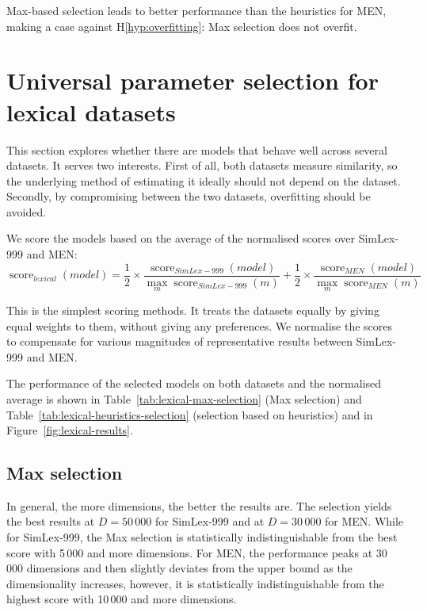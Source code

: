 Max-based selection leads to better performance than the heuristics for MEN, making a case against H\ref{hyp:overfitting}: Max selection does not overfit.

\section{Universal parameter selection for lexical datasets}
\label{sec:universal-lexical-param-selection}

This section explores whether there are models that behave well across several datasets. It serves two interests. First of all, both datasets measure similarity, so the underlying method of estimating it ideally should not depend on the dataset. Secondly, by compromising between the two datasets, overfitting should be avoided.

We score the models based on the average of the normalised scores over SimLex-999 and MEN:
\begin{equation}
\operatorname{score}_\mathit{lexical}(\mathit{model}) =%
\frac{1}{2}\times%
\frac{\operatorname{score}_\mathit{SimLex-999}(\mathit{model})}%
{\max_m\operatorname{score}_\mathit{SimLex-999}(m)}%
+%
\frac{1}{2}\times%
\frac{\operatorname{score}_\mathit{MEN}(\mathit{model})}%
{\max_m\operatorname{score}_\mathit{MEN}(m)}%
\end{equation}

This is the simplest scoring methods. It treats the datasets equally by giving equal weights to them, without giving any preferences. We normalise the scores to compensate for various magnitudes of representative results between SimLex-999 and MEN.

The performance of the selected models on both datasets and the normalised average is shown in Table~\ref{tab:lexical-max-selection} (Max selection) and Table~\ref{tab:lexical-heuristics-selection} (selection based on heuristics) and in Figure~\ref{fig:lexical-results}.



\subsection{Max selection}
\label{sec:max-selection}

In general, the more dimensions, the better the results are. The selection yields the best results at $D = 50\,000$ for SimLex-999 and at $D = 30\,000$ for MEN. While for SimLex-999, the Max selection is statistically indistinguishable from the best score with 5\,000 and more dimensions. For MEN, the performance peaks at 30\,000 dimensions and then slightly deviates from the upper bound as the dimensionality increases, however, it is statistically indistinguishable from the highest score with 10\,000 and more dimensions.

